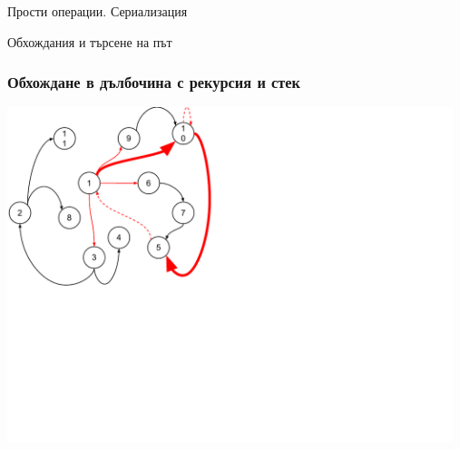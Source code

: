 \documentclass{beamer}
\begin{document}
\begin{frame}
\centerline{Прости операции. Сериализация}
\end{frame}

\begin{frame}
\centerline{Обхождания и търсене на път}
\end{frame}

\begin{frame}[fragile]
\frametitle{Обхождане в дълбочина с рекурсия и стек}
 

 \includegraphics[width=13cm]{images/graph_dfs}


\end{frame}
\end{document}
